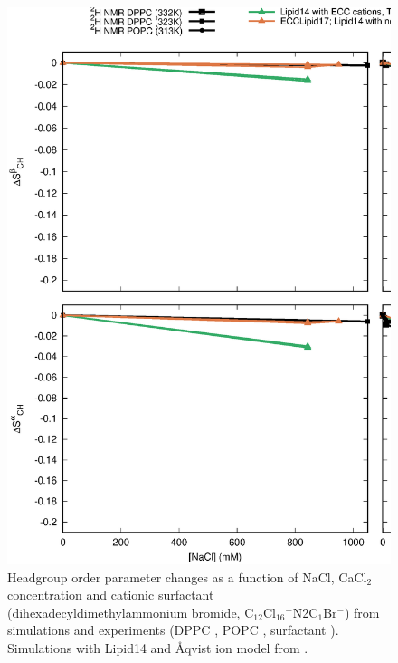 \documentclass[aip,jcp,twocolumn]{revtex4}
\begin{document}
\begin{figure}[]
  \centering
  \includegraphics[width=16.0cm]{../Fig/OrdParChanges_NaCl_CaCl2_surf.eps}
  \caption{\label{OrderParameterCHANGESnewMODELS}
    Headgroup order parameter changes as a function of NaCl, CaCl$_2$ concentration and
    cationic surfactant (dihexadecyldimethylammonium bromide, C$_{12}$Cl$_{16}$$^+$N2C$_1$Br$^-$)
    from simulations and experiments (DPPC \cite{akutsu81}, POPC \cite{altenbach84}, surfactant \cite{scherer89}).
    Simulations with Lipid14 and Åqvist ion model from \cite{catte16,lipid14POPC0mMNaClfiles,lipid14POPC350mMCaClfiles,lipid14POPC1000mMCaClfiles}.
  }
\end{figure}
\end{document}
